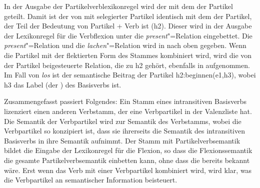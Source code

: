 In der Ausgabe der Partikelverblexikonregel wird der \contw mit dem \contw der Partikel
 geteilt. Damit ist der \ltopw von  mit selegierter Partikel identisch mit dem
\ltopw der Partikel, der Teil der Bedeutung von Partikel + Verb ist (\ltop h2). Dieser \ltopw wird in der Ausgabe der Lexikonregel für die Verbflexion
unter die \emph{present}"=Relation eingebettet. Die \emph{present}"=Relation und die
\emph{lachen}"=Relation wird in \rels nach oben gegeben. Wenn die Partikel mit der
flektierten Form des Stammes  kombiniert wird, wird die von der Partikel beigesteuerte Relation, die zu
h2 gehört, ebenfalls in \rels aufgenommen. Im Fall von \emph{los} ist der semantische Beitrag der Partikel
h2:beginnen(e1,h3), wobei h3 das Label (der \ltopw) des Basisverbs ist. 

Zusammengefasst passiert Folgendes: Ein Stamm eines intransitiven Basisverbs lizenziert einen
anderen Verbstamm, der eine Verbpartikel in der Valenzliste hat. Die Semantik der Verbpartikel wird
zur Semantik des Verbstamms, wobei die Verbpartikel so konzipiert ist, dass sie ihrerseits die
Semantik des intransitiven Basisverbs in ihre Semantik aufnimmt. Der Stamm mit Partikelverbsemantik
bildet die Eingabe der Lexikonregel für die Flexion, so dass die Flexionssemantik die gesamte
Partikelverbsemantik einbetten kann, ohne dass die bereits bekannt wäre. Erst wenn das Verb mit
einer Verbpartikel kombiniert wird, wird klar, was die Verbpartikel an semantischer Information beisteuert.  

